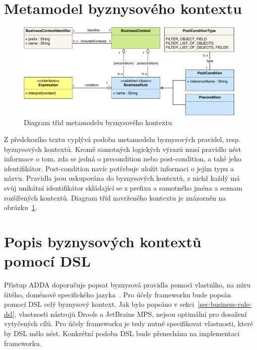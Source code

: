\section{Metamodel byznysového kontextu}\label{sec:metamodel}

\begin{figure}
    \centering
    \includegraphics[keepaspectratio=true, width=\linewidth]{figures/business-context-metamodel.pdf}
    \caption{Diagram tř\'{\i}d metamodelu byznysového kontextu}
    \label{fig:business-context-metamodel}
\end{figure}

Z předchozího textu vyplývá podoba metamodelu byznysových pravidel, resp. byznysových kontextů.
Kromě samotných logických výrazů musí pravidlo nést informace o tom, zda
se jedná o precondition nebo post-condition, a také jeho identifikátor.
Post-condition navíc potřebuje uložit informaci o jejím typu a názvu. Pravidla jsou uskupována
do byznysových kontextů, z nichž každý má svůj unikátní identifikátor skládající se z prefixu
a samotného jména a seznam rozšířených kontextů. Diagram tříd navrženého kontextu je znázorněn
na obrázku~\ref{fig:business-context-metamodel}.

\section{Popis byznysových kontextů pomocí \gls{DSL}}

Př\'{\i}stup \gls{ADDA} doporučuje popsat byznysová pravidla pomoc\'{\i}
vlastn\'{\i}ho, na m\'{\i}ru šitého, doménově specifického jazyka~\cite{cemus2015automated}.
Pro účely frameworku bude popsán pomocí \gls{DSL} celý byznysový kontext.
Jak bylo popsáno v sekci~\ref{sec:business-rule-dsl}, vlastnosti nástrojů Drools a JetBrains MPS,
nejsou optimální pro dosažení vytyčených cílů. Pro účely frameworku je tedy nutné specifikovat vlastnosti,
které by \gls{DSL} mělo nést. Konkrétní podoba DSL bude přenechána na implementaci frameworku.

